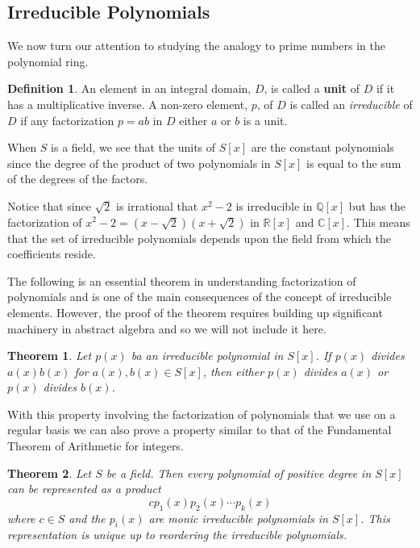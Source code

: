 \documentclass[
]{book}
\newtheorem{theorem}{Theorem}[chapter]
\theoremstyle{definition}
\newtheorem{definition}{Definition}[chapter]
\theoremstyle{definition}
\theoremstyle{definition}
\theoremstyle{remark}
\begin{document}
\hypertarget{irreducible-polynomials}{%
\subsection{Irreducible Polynomials}\label{irreducible-polynomials}}

We now turn our attention to studying the analogy to prime numbers in the polynomial ring.

\begin{definition}
\protect\hypertarget{def:unnamed-chunk-204}{}{\label{def:unnamed-chunk-204} }An element in an integral domain, \(D\), is called a \textbf{unit} of \(D\) if it has a multiplicative inverse. A non-zero element, \(p\), of \(D\) is called an \emph{irreducible} of \(D\) if any factorization \(p=ab\) in \(D\) either \(a\) or \(b\) is a unit.
\end{definition}

When \(S\) is a field, we see that the units of \(S[x]\) are the constant polynomials since the degree of the product of two polynomials in \(S[x]\) is equal to the sum of the degrees of the factors.

Notice that since \(\sqrt{2}\) is irrational that \(x^2-2\) is irreducible in \(\mathbb{Q}[x]\) but has the factorization of \(x^2-2=(x-\sqrt{2})(x+\sqrt{2})\) in \(\mathbb{R}[x]\) and \(\mathbb{C}[x]\). This means that the set of irreducible polynomials depends upon the field from which the coefficients reside.

The following is an essential theorem in understanding factorization of polynomials and is one of the main consequences of the concept of irreducible elements. However, the proof of the theorem requires building up significant machinery in abstract algebra and so we will not include it here.

\begin{theorem}
\protect\hypertarget{thm:unnamed-chunk-205}{}{\label{thm:unnamed-chunk-205} }Let \(p(x)\) ba an irreducible polynomial in \(S[x]\). If \(p(x)\) divides \(a(x)b(x)\) for \(a(x),b(x)\in S[x]\), then either \(p(x)\) divides \(a(x)\) or \(p(x)\) divides \(b(x)\).
\end{theorem}

With this property involving the factorization of polynomials that we use on a regular basis we can also prove a property similar to that of the Fundamental Theorem of Arithmetic for integers.

\begin{theorem}
\protect\hypertarget{thm:polynomial-factorization}{}{\label{thm:polynomial-factorization} }Let \(S\) be a field. Then every polynomial of positive degree in \(S[x]\) can be represented as a product
\[ c p_1(x) p_2(x) \cdots p_k(x)\] where \(c\in S\) and the \(p_i(x)\) are monic irreducible polynomials in \(S[x]\). This representation is unique up to reordering the irreducible polynomials.
\end{theorem}
\end{document}
